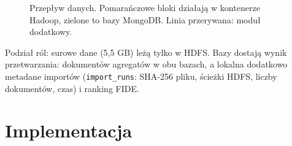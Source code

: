 \documentclass[11pt,a4paper]{article}
\newcommand{\kod}[1]{\texttt{#1}}
\begin{document}
\begin{figure}[H]
{}
\endgroup
\caption{Przepływ danych. Pomarańczowe bloki działają w kontenerze Hadoop, zielone to bazy MongoDB. Linia przerywana: moduł dodatkowy.}\label{fig:flow}
\end{figure}

Podział ról: surowe dane (5,5 GB) leżą tylko w HDFS. Bazy dostają wynik przetwarzania: \nRows{} dokumentów agregatów w obu bazach, a lokalna dodatkowo metadane importów (\kod{import\_runs}: SHA-256 pliku, ścieżki HDFS, liczby dokumentów, czas) i ranking FIDE.

\section{Implementacja}
\end{document}
